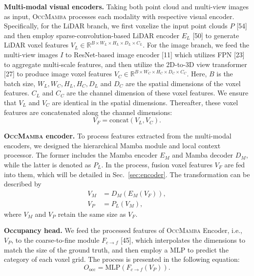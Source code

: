 \documentclass[10pt,twocolumn,letterpaper]{article}
\newcommand{\methodname}{\textsc{OccMamba}}
\begin{document}
\textbf{Multi-modal visual encoders.}
Taking both point cloud and multi-view images as input, \methodname{} processes each modality with respective visual encoder. Specifically, for the LiDAR branch, we first voxelize the input point clouds $P$ [54] and then employ sparse-convolution-based LiDAR encoder $E_L$ [50] to generate LiDAR voxel features $V_L \in \mathbb{R}^{B \times W_L \times H_L \times D_L \times C_L}$. For the image branch, we feed the multi-view images $I$ to ResNet-based image encoder [11] which utilizes FPN [23] to aggregate multi-scale features, and then utilize the 2D-to-3D view transformer [27] to produce image voxel features $V_C \in \mathbb{R}^{B \times W_C \times H_C \times D_C \times C_C}$. Here, $B$ is the batch size, $W_L, W_C, H_L, H_C, D_L$ and $D_C$ are the spatial dimensions of the voxel features. $C_L$ and $C_C$ are the channel dimension of these voxel features. We ensure that $V_L$ and $V_C$ are identical in the spatial dimensions. Thereafter, these voxel features are concatenated along the channel dimensions:
\begin{equation}
  V_F = \text{concat}(V_L, V_C). \label{eq:concat}
\end{equation}

\textbf{\methodname{} encoder.}
To process features extracted from the multi-modal encoders, we designed the hierarchical Mamba module and local context processor. The former includes the Mamba encoder $E_M$ and Mamba decoder $D_M$, while the latter is denoted as $P_L$. In the process, fusion voxel features $V_F$ are fed into them, which will be detailed in Sec.~\ref{sec:encoder}. The transformation can be described by
\begin{align}
  V_M &= D_M(E_M(V_F)), \label{eq:mamba_enc} \\
  V_P &= P_L(V_M), \label{eq:local_proc}
\end{align}
where $V_M$ and $V_P$ retain the same size as $V_F$.

\textbf{Occupancy head.}
We feed the processed features of \methodname{} Encoder, i.e., $V_P$, to the coarse-to-fine module $F_{c \to f}$ [45], which interpolates the dimensions to match the size of the ground truth, and then employ a MLP to predict the category of each voxel grid. The process is presented in the following equation:
\begin{equation}
  O_\text{occ} = \text{MLP}(F_{c \to f}(V_P)). \label{eq:head}
\end{equation}
\end{document}
